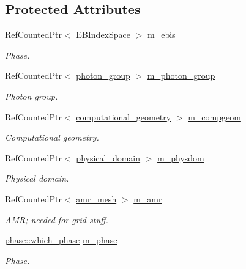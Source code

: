 \subsection*{Protected Attributes}
\begin{DoxyCompactItemize}
\item 
Ref\+Counted\+Ptr$<$ E\+B\+Index\+Space $>$ \hyperlink{classrte__solver_a3f5fa6388034fcf229f3a0b347a4fd54}{m\+\_\+ebis}
\begin{DoxyCompactList}\small\item\em Phase. \end{DoxyCompactList}\item 
Ref\+Counted\+Ptr$<$ \hyperlink{classphoton__group}{photon\+\_\+group} $>$ \hyperlink{classrte__solver_a9d63be064a2ade825fa898d6d86f1e22}{m\+\_\+photon\+\_\+group}
\begin{DoxyCompactList}\small\item\em Photon group. \end{DoxyCompactList}\item 
Ref\+Counted\+Ptr$<$ \hyperlink{classcomputational__geometry}{computational\+\_\+geometry} $>$ \hyperlink{classrte__solver_adab5bbc90842bd7625e85f9bab4c8a99}{m\+\_\+compgeom}
\begin{DoxyCompactList}\small\item\em Computational geometry. \end{DoxyCompactList}\item 
Ref\+Counted\+Ptr$<$ \hyperlink{classphysical__domain}{physical\+\_\+domain} $>$ \hyperlink{classrte__solver_aeef61202054631e0f0ad0fe33a081dfe}{m\+\_\+physdom}
\begin{DoxyCompactList}\small\item\em Physical domain. \end{DoxyCompactList}\item 
Ref\+Counted\+Ptr$<$ \hyperlink{classamr__mesh}{amr\+\_\+mesh} $>$ \hyperlink{classrte__solver_af873b7673b52e2648885422254de3715}{m\+\_\+amr}
\begin{DoxyCompactList}\small\item\em A\+MR; needed for grid stuff. \end{DoxyCompactList}\item 
\hyperlink{namespacephase_a23c76f548a5eb1955ed8c929c541108b}{phase\+::which\+\_\+phase} \hyperlink{classrte__solver_aeb46ac9c37dbbb8eb87e603136f841ec}{m\+\_\+phase}
\begin{DoxyCompactList}\small\item\em Phase. \end{DoxyCompactList}\item 

\end{DoxyCompactItemize}

